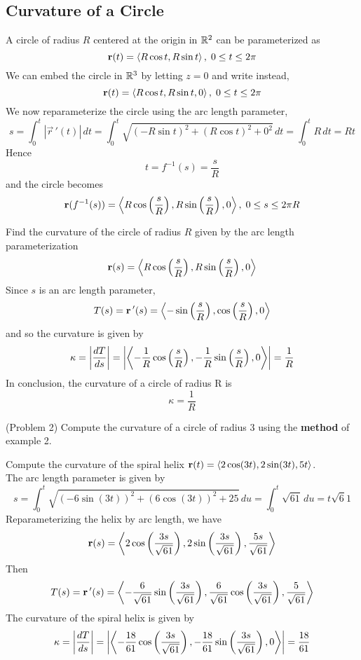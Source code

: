 \documentclass[handout]{ximera}
\begin{document}
\subsection{Curvature of a Circle}
A circle of radius $R$ centered at the origin in $\mathbb R^2$ can be parameterized as
\[
\mathbf r(t) = \left\langle R\cos t, R\sin t\right\rangle, \; 0\leq t \leq 2\pi
\]
We can embed the circle in $\mathbb R^3$ by letting $z = 0$ and write instead,
\[
\mathbf r(t) = \left\langle R\cos t, R\sin t, 0\right\rangle, \; 0\leq t \leq 2\pi
\]
We now reparameterize the circle using the arc length parameter,
\[
s = \int_0^t |\vec r\,'(t)| \, dt = \int_0^t \sqrt{ (-R\sin t)^2 + (R\cos t)^2 + 0^2} \, dt = \int_0^t R \, dt = Rt
\]
Hence 
\[
t = f^{-1}(s) = \frac{s}{R}
\]
and the circle becomes
\[
\mathbf r(f^{-1}(s)) = \left\langle R \cos\left(\frac{s}{R}\right), R \sin\left(\frac{s}{R}\right), 0\right\rangle, \; 0 \leq s \leq 2\pi R
\]
\begin{example}[Example 2]
Find the curvature of the circle of radius $R$ given by the arc length parameterization
\[
\mathbf r(s) = \left\langle R \cos\left(\frac{s}{R}\right), R \sin\left(\frac{s}{R}\right), 0\right\rangle
\]
Since $s$ is an arc length parameter, 
\[
T(s) = \mathbf r\,'(s) = \left\langle -\sin\left(\frac{s}{R}\right), \cos\left(\frac{s}{R}\right), 0\right\rangle
\]
and so the curvature is given by
\[
\kappa = \left|\frac{dT}{ds}\right| = \left|\left\langle -\frac{1}{R}\cos\left(\frac{s}{R}\right), -\frac{1}{R}\sin\left(\frac{s}{R}\right), 0\right\rangle\right| = \frac{1}{R}
\]
In conclusion, the curvature of a circle of radius R is 
\[
\kappa = \frac{1}{R}
\]
\end{example}

\begin{problem}(Problem 2)
Compute the curvature of a circle of radius 3 using the \textbf{method} of example 2.
\end{problem}

\begin{example}[Example 3]
Compute the curvature of the spiral helix $\mathbf r(t) = \left\langle 2\cos(3t), 2 \sin(3t), 5t\right\rangle$.\\
The arc length parameter is given by
\[
s = \int_0^t \sqrt{\left(-6\sin(3t) \right)^2+\left(6\cos(3t) \right)^2 + 25} \, du = \int_0^t \sqrt{61} \, du = t\sqrt 61
\]
Reparameterizing the helix by arc length, we have
\[
\mathbf r(s) = \left\langle 2\cos\left(\frac{3s}{\sqrt{61}}\right), 2 \sin\left(\frac{3s}{\sqrt{61}}\right), \frac{5s}{\sqrt{61}}\right\rangle
\]
Then
\[
T(s) = \mathbf r\,'(s) = \left\langle -\frac{6}{\sqrt{61}}\sin\left(\frac{3s}{\sqrt{61}}\right), \frac{6}{\sqrt{61}}\cos\left(\frac{3s}{\sqrt{61}}\right), \frac{5}{\sqrt{61}}\right\rangle
\]
The curvature of the spiral helix is given by
\[
\kappa = \left| \frac{dT}{ds} \right| = \left|\left\langle -\frac{18}{61}\cos\left(\frac{3s}{\sqrt{61}}\right), -\frac{18}{61}\sin\left(\frac{3s}{\sqrt{61}}\right), 0\right\rangle\right| = \frac{18}{61}
\]
\end{example}
\end{document}
